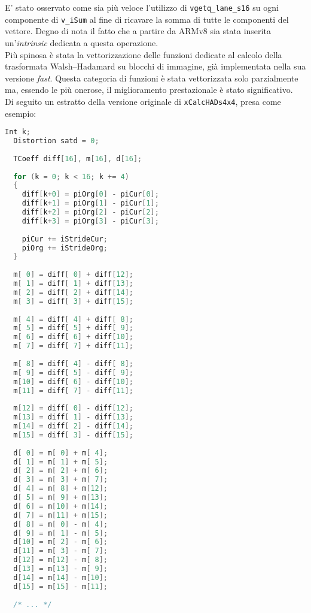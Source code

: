 E' stato osservato come sia più veloce l'utilizzo di \verb|vgetq_lane_s16| su 
ogni componente di \verb|v_iSum| al fine di ricavare la somma di tutte le 
componenti del vettore. Degno di nota il fatto che a partire da ARMv8 sia stata 
inserita un'\emph{intrinsic} dedicata a questa operazione.\\

Più spinosa è stata la vettorizzazione delle funzioni dedicate al calcolo della 
trasformata Walsh–Hadamard su blocchi di immagine, già implementata nella sua 
versione \emph{fast}. Questa categoria di funzioni è stata vettorizzata solo 
parzialmente ma, essendo le più onerose, il miglioramento prestazionale è stato 
significativo.\\

Di seguito un estratto della versione originale di \verb|xCalcHADs4x4|, presa 
come esempio:

\begin{lstlisting}[language=C]
  Int k;
  Distortion satd = 0;
  
  TCoeff diff[16], m[16], d[16];
  
  for (k = 0; k < 16; k += 4)
  {
    diff[k+0] = piOrg[0] - piCur[0];
    diff[k+1] = piOrg[1] - piCur[1];
    diff[k+2] = piOrg[2] - piCur[2];
    diff[k+3] = piOrg[3] - piCur[3];
  
    piCur += iStrideCur;
    piOrg += iStrideOrg;
  }
  
  m[ 0] = diff[ 0] + diff[12];
  m[ 1] = diff[ 1] + diff[13];
  m[ 2] = diff[ 2] + diff[14];
  m[ 3] = diff[ 3] + diff[15];
  
  m[ 4] = diff[ 4] + diff[ 8];
  m[ 5] = diff[ 5] + diff[ 9];
  m[ 6] = diff[ 6] + diff[10];
  m[ 7] = diff[ 7] + diff[11];
  
  m[ 8] = diff[ 4] - diff[ 8];
  m[ 9] = diff[ 5] - diff[ 9];
  m[10] = diff[ 6] - diff[10];
  m[11] = diff[ 7] - diff[11];
  
  m[12] = diff[ 0] - diff[12];
  m[13] = diff[ 1] - diff[13];
  m[14] = diff[ 2] - diff[14];
  m[15] = diff[ 3] - diff[15];
  
  d[ 0] = m[ 0] + m[ 4];
  d[ 1] = m[ 1] + m[ 5];
  d[ 2] = m[ 2] + m[ 6];
  d[ 3] = m[ 3] + m[ 7];
  d[ 4] = m[ 8] + m[12];
  d[ 5] = m[ 9] + m[13];
  d[ 6] = m[10] + m[14];
  d[ 7] = m[11] + m[15];
  d[ 8] = m[ 0] - m[ 4];
  d[ 9] = m[ 1] - m[ 5];
  d[10] = m[ 2] - m[ 6];
  d[11] = m[ 3] - m[ 7];
  d[12] = m[12] - m[ 8];
  d[13] = m[13] - m[ 9];
  d[14] = m[14] - m[10];
  d[15] = m[15] - m[11];
  
  /* ... */
\end{lstlisting}

